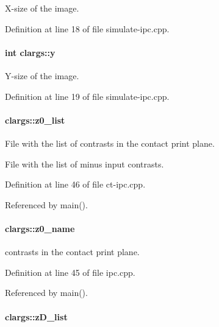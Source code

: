 X-\/size of the image. 



Definition at line 18 of file simulate-\/ipc.cpp.

\hypertarget{structclargs_a004af862a0d20dacb1088b9d6e2d1d61}{
\paragraph[{y}]{\setlength{\rightskip}{0pt plus 5cm}int {\bf clargs::y}}\hfill}
\label{structclargs_a004af862a0d20dacb1088b9d6e2d1d61}


Y-\/size of the image. 



Definition at line 19 of file simulate-\/ipc.cpp.

\hypertarget{structclargs_ab0312c400b7341a6a9449cacf948487e}{
\paragraph[{z0\_\-list}]{ {\bf clargs::z0\_\-list}}\hfill}
\label{structclargs_ab0312c400b7341a6a9449cacf948487e}


File with the list of contrasts in the contact print plane. 

File with the list of minus input contrasts. 

Definition at line 46 of file ct-\/ipc.cpp.



Referenced by main().

\hypertarget{structclargs_a529a1ba833bfd7f322089ee7e1de57ec}{
\paragraph[{z0\_\-name}]{ {\bf clargs::z0\_\-name}}\hfill}
\label{structclargs_a529a1ba833bfd7f322089ee7e1de57ec}


contrasts in the contact print plane. 



Definition at line 45 of file ipc.cpp.



Referenced by main().

\hypertarget{structclargs_a8d1b356aa854d772d99d7e8560fd46d4}{
\paragraph[{zD\_\-list}]{ {\bf clargs::zD\_\-list}}\hfill}
\label{structclargs_a8d1b356aa854d772d99d7e8560fd46d4}


